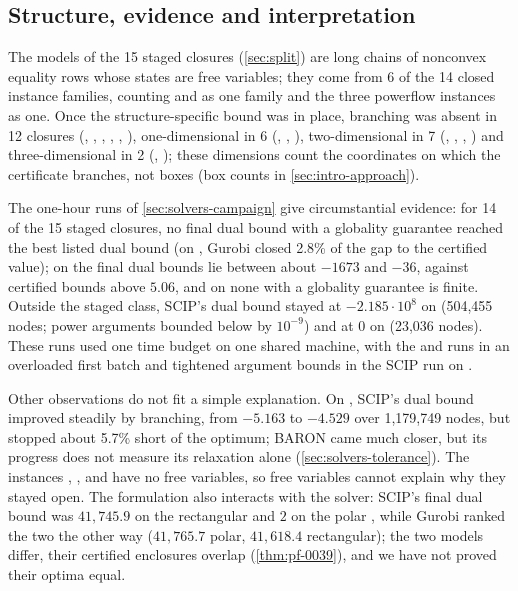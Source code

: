 \subsection{Structure, evidence and interpretation}\label{sec:interpretation-structure}

The models of the 15 staged closures (\cref{sec:split}) are long chains of nonconvex equality rows whose states are free variables; they come from 6 of the 14 closed instance families, counting  and  as one family and the three powerflow instances as one.
Once the structure-specific bound was in place, branching was absent in 12 closures (, , , , , ), one-dimensional in 6 (, , ), two-dimensional in 7 (, , , ) and three-dimensional in 2 (, ); these dimensions count the coordinates on which the certificate branches, not boxes (box counts in \cref{sec:intro-approach}).

\label{sec:interpretation-evidence}The one-hour runs of \cref{sec:solvers-campaign} give circumstantial evidence: for 14 of the 15 staged closures, no final dual bound with a globality guarantee reached the best listed dual bound (on , Gurobi closed 2.8\% of the gap to the certified value); on  the final dual bounds lie between about $-1673$ and $-36$, against certified bounds above $5.06$, and on  none with a globality guarantee is finite.
Outside the staged class, SCIP's dual bound stayed at $-2.185\cdot10^{8}$ on  (504,455 nodes; power arguments bounded below by $10^{-9}$) and at $0$ on  (23,036 nodes).
These runs used one time budget on one shared machine, with the  and  runs in an overloaded first batch and tightened argument bounds in the SCIP run on .

Other observations do not fit a simple explanation.
On , SCIP's dual bound improved steadily by branching, from $-5.163$ to $-4.529$ over 1,179,749 nodes, but stopped about 5.7\% short of the optimum; BARON came much closer, but its progress does not measure its relaxation alone (\cref{sec:solvers-tolerance}).
The instances , ,  and  have no free variables, so free variables cannot explain why they stayed open.
The formulation also interacts with the solver: SCIP's final dual bound was $41{,}745.9$ on the rectangular  and $2$ on the polar , while Gurobi ranked the two the other way ($41{,}765.7$ polar, $41{,}618.4$ rectangular); the two models differ, their certified enclosures overlap (\cref{thm:pf-0039}), and we have not proved their optima equal.

